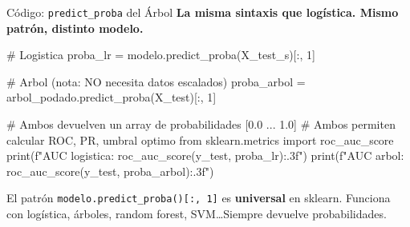 \documentclass[aspectratio=169, 11pt]{beamer}
\begin{document}
\begin{frame}[fragile,shrink=10]{Código: \texttt{predict\_proba} del Árbol}
  \vspace{-4pt}
  {\footnotesize\color{arcaDark}\bfseries
    La misma sintaxis que logística. Mismo patrón, distinto modelo.}

  \vspace{4pt}
  \begin{pyblock}
# Logistica
proba_lr = modelo.predict_proba(X_test_s)[:, 1]

# Arbol (nota: NO necesita datos escalados)
proba_arbol = arbol_podado.predict_proba(X_test)[:, 1]

# Ambos devuelven un array de probabilidades [0.0 ... 1.0]
# Ambos permiten calcular ROC, PR, umbral optimo
from sklearn.metrics import roc_auc_score
print(f"AUC logistica: {roc_auc_score(y_test, proba_lr):.3f}")
print(f"AUC arbol:     {roc_auc_score(y_test, proba_arbol):.3f}")
  \end{pyblock}

  \vspace{4pt}
  {\scriptsize\color{textMuted}
    \faKey\hspace{4pt} El patrón \texttt{modelo.predict\_proba()[:, 1]}
    es \textbf{universal} en sklearn. Funciona con logística, árboles,
    random forest, SVM\ldots Siempre devuelve probabilidades.}
\end{frame}
\end{document}
